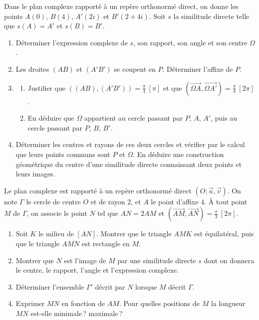 \begin{exo}\label{exo:sim-centre-cercles}
      Dans le plan complexe rapporté à un repère orthonormé direct, on donne les points
      $A(0)$, $B(4)$, $A'(2i)$ et $B'(2 + 4i)$. Soit $s$ la similitude directe telle que $s(A) = A'$ et $s(B) = B'$.
      \begin{enumerate}
            \item Déterminer l'expression complexe de $s$, son rapport, son angle et son centre $\Omega$.
            \item Les droites $(AB)$ et $(A'B')$ se coupent en $P$. Déterminer l'affixe de $P$.
            \item \begin{enumerate}
                        \item Justifier que $\left((AB),(A'B')\right) = \frac{\pi}{4}\ [\pi]$ et que $(\overrightarrow{\Omega A},\overrightarrow{\Omega A'}) = \frac{\pi}{4}\ [2\pi]$.
                        \item En déduire que $\Omega$ appartient au cercle passant par $P$, $A$, $A'$, puis au cercle passant par $P$, $B$, $B'$.
                  \end{enumerate}
            \item Déterminer les centres et rayons de ces deux cercles et vérifier par le calcul que leurs points communs sont $P$ et $\Omega$.
                  En déduire une construction géométrique du centre d'une similitude directe connaissant deux points et leurs images.
      \end{enumerate}
\end{exo}
\begin{exo}\label{exo:sim-lieu}
      Le plan complexe est rapporté à un repère orthonormé direct $(O;\vec{u},\vec{v})$.
      On note $\Gamma$ le cercle de centre $O$ et de rayon $2$, et $A$ le point d'affixe $4$.
      À tout point $M$ de $\Gamma$, on associe le point $N$ tel que $AN = 2AM$ et $(\overrightarrow{AM},\overrightarrow{AN}) = \frac{\pi}{3}\ [2\pi]$.
      \begin{enumerate}
            \item Soit $K$ le milieu de $[AN]$. Montrer que le triangle $AMK$ est équilatéral, puis que le triangle $AMN$ est rectangle en $M$.
            \item Montrer que $N$ est l'image de $M$ par une similitude directe $s$ dont on donnera le centre, le rapport, l'angle et l'expression complexe.
            \item Déterminer l'ensemble $\Gamma'$ décrit par $N$ lorsque $M$ décrit $\Gamma$.
            \item Exprimer $MN$ en fonction de $AM$. Pour quelles positions de $M$ la longueur $MN$ est-elle minimale\,? maximale\,?
      \end{enumerate}
\end{exo}
